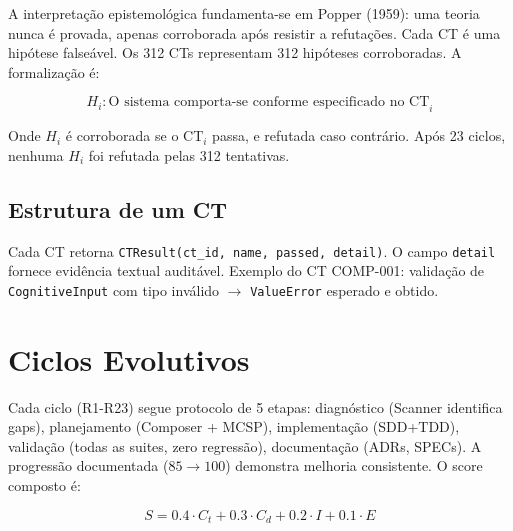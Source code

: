 A interpretação epistemológica fundamenta-se em Popper (1959): uma teoria nunca é provada, apenas corroborada após resistir a refutações. Cada CT é uma hipótese falseável. Os 312 CTs representam 312 hipóteses corroboradas. A formalização é:

\begin{equation}
H_i: \text{O sistema comporta-se conforme especificado no CT}_i
\label{eq:hypothesis}
\end{equation}

Onde $H_i$ é corroborada se o CT$_i$ passa, e refutada caso contrário. Após 23 ciclos, nenhuma $H_i$ foi refutada pelas 312 tentativas.

\subsection{Estrutura de um CT}

Cada CT retorna \texttt{CTResult(ct\_id, name, passed, detail)}. O campo \texttt{detail} fornece evidência textual auditável. Exemplo do CT COMP-001: validação de \texttt{CognitiveInput} com tipo inválido $\rightarrow$ \texttt{ValueError} esperado e obtido.

\section{Ciclos Evolutivos}

Cada ciclo (R1-R23) segue protocolo de 5 etapas: diagnóstico (Scanner identifica gaps), planejamento (Composer + MCSP), implementação (SDD+TDD), validação (todas as suites, zero regressão), documentação (ADRs, SPECs). A progressão documentada ($85 \rightarrow 100$) demonstra melhoria consistente. O score composto é:

\begin{equation}
S = 0.4 \cdot C_t + 0.3 \cdot C_d + 0.2 \cdot I + 0.1 \cdot E
\label{eq:cycle_score}
\end{equation}

